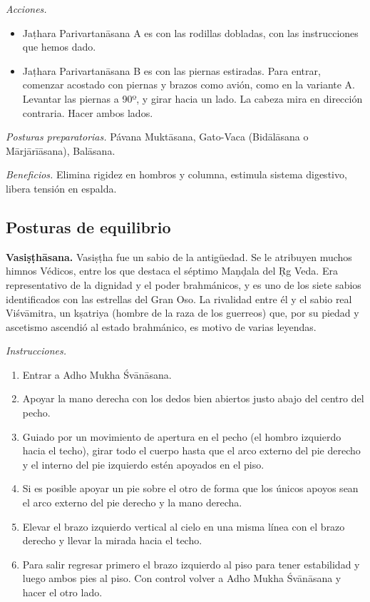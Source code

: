 \emph{Acciones.}
\begin{itemize}
\item Jaṭhara Parivartanāsana A es con las
rodillas dobladas, con las instrucciones que
hemos dado.
\item Jaṭhara Parivartanāsana B es con las
piernas estiradas. Para entrar, comenzar
acostado con piernas y brazos como avión,
como en la variante A. Levantar las piernas a
90º, y girar hacia un lado. La cabeza mira en
dirección contraria. Hacer ambos lados.
\end{itemize}

\emph{Posturas preparatorias.} Pávana
Muktāsana, Gato-Vaca (Bidālāsana o
Mārjārīāsana), Balāsana.

\emph{Beneficios.} Elimina rigidez en hombros
y columna, estimula sistema digestivo, libera
tensión en espalda.

\subsection{Posturas de equilibrio}
\label{section-posturas-de-equilibrio}

\medskip\noindent\textbf{Vasiṣṭhāsana.}
Vasiṣṭha fue un sabio de la antigüedad. Se le
atribuyen muchos himnos Védicos, entre los
que destaca el séptimo Maṇḍala del
\d{R}g Veda.
Era representativo de la dignidad y el poder
brahmánicos, y es uno de los siete sabios
identificados con las estrellas del Gran Oso.
La rivalidad entre él y el sabio real
Viśvāmitra, un kṣatriya (hombre de la raza de
los guerreos) que, por su piedad y ascetismo
ascendió al estado brahmánico, es motivo de
varias leyendas.

\emph{Instrucciones.}
\begin{enumerate}
\item Entrar a Adho Mukha Śvānāsana.
\item Apoyar la mano derecha con los dedos
bien abiertos justo abajo del centro del
pecho.
\item Guiado por un movimiento de apertura en
el pecho (el hombro izquierdo hacia el
techo), girar todo el cuerpo hasta que el
arco externo del pie derecho y el interno del
pie izquierdo estén apoyados en el piso.
\item Si es posible apoyar un pie sobre el
otro de forma que los únicos apoyos sean el
arco externo del pie derecho y la mano
derecha.
\item Elevar el brazo izquierdo vertical al
cielo en una misma línea con el brazo derecho
y llevar la mirada hacia el techo.
\item Para salir regresar primero el brazo
izquierdo al piso para tener estabilidad y
luego ambos pies al piso. Con control volver
a Adho Mukha Śvānāsana y hacer el otro lado.
\end{enumerate}

